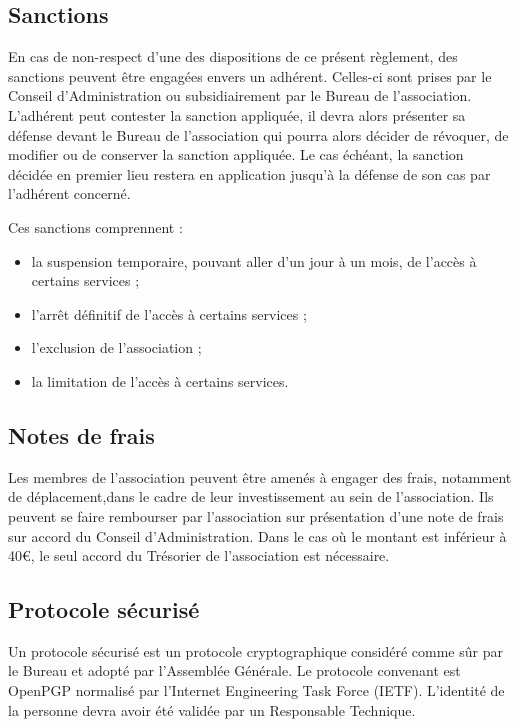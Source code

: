 \documentclass[12pt]{article}
\begin{document}
    \subsection{Sanctions}

		En cas de non-respect d’une des dispositions de ce présent règlement, des sanctions peuvent être engagées envers un adhérent. Celles-ci sont prises par le Conseil d’Administration ou subsidiairement par le Bureau de l’association. L’adhérent peut contester la sanction appliquée, il devra alors présenter sa défense devant le Bureau de l’association qui pourra alors décider de révoquer, de modifier ou de conserver la sanction appliquée. Le cas échéant, la sanction décidée en premier lieu restera en application jusqu’à la défense de son cas par l’adhérent concerné.
		                                                        
		Ces sanctions comprennent :
	
		\begin{itemize}                          
 			\item[\textbullet] la suspension temporaire, pouvant aller d’un jour à un mois, de l’accès à certains services ;
 			\item[\textbullet] l’arrêt définitif de l’accès à certains services ;
 			\item[\textbullet] l’exclusion de l’association ;
 			\item[\textbullet] la limitation de l’accès à certains services.
 		\end{itemize}

    \subsection{Notes de frais}
 
		Les membres de l’association peuvent être amenés à engager des frais, notamment de déplacement,dans le cadre de leur investissement au sein de l’association. Ils peuvent se faire rembourser par l’association sur présentation d’une note de frais sur accord du Conseil d’Administration. Dans le cas où le montant est inférieur à 40\euro , le seul accord du Trésorier de l’association est nécessaire.

    \subsection{Protocole sécurisé}

		Un protocole sécurisé est un protocole cryptographique considéré comme sûr par le Bureau et adopté par l’Assemblée Générale.
		Le protocole convenant est OpenPGP normalisé par l’Internet Engineering Task Force (IETF). L’identité de la personne devra avoir été validée par un Responsable Technique.
\end{document}
